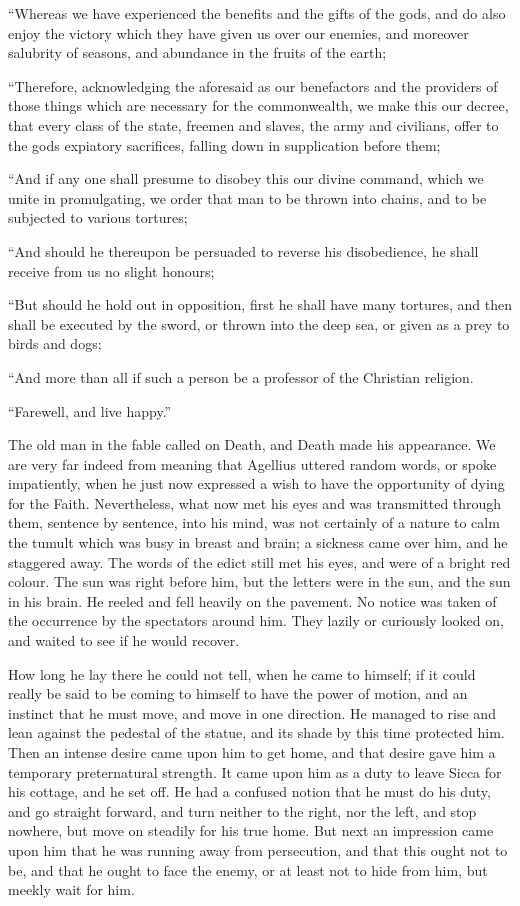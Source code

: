 ``Whereas we have experienced the benefits and the gifts of the
gods, and do also enjoy the victory which they have given us over our
enemies, and moreover salubrity of seasons, and abundance in the
fruits of the earth;

``Therefore, acknowledging the aforesaid as our benefactors and the providers of those things which are necessary for
the commonwealth, we make this our decree, that every class of the
state, freemen and slaves, the army and civilians, offer to the gods
expiatory sacrifices, falling down in supplication before them;

``And if any one shall presume to disobey this our divine
command, which we unite in promulgating, we order that man to be
thrown into chains, and to be subjected to various tortures;

``And should he thereupon be persuaded to reverse his
disobedience, he shall receive from us no slight honours;

``But should he hold out in opposition, first he shall have
many tortures, and then shall be executed by the sword, or thrown into
the deep sea, or given as a prey to birds and dogs;

``And more than all if such a person be a professor of the
Christian religion.

``Farewell, and live happy.''

The old man in the fable called on Death, and Death made his
appearance. We are very far indeed from meaning that Agellius uttered
random words, or spoke impatiently, when he just now expressed a wish
to have the opportunity of dying for the Faith. Nevertheless, what now
met his eyes and was transmitted through them, sentence by sentence,
into his mind, was not certainly of a nature to calm the tumult which
was busy in breast and brain; a sickness came over him, and he
staggered away. The words of the edict still met his eyes, and
were of a bright red colour. The sun was right before him, but the
letters were in the sun, and the sun in his brain. He reeled and fell
heavily on the pavement. No notice was taken of the occurrence by the
spectators around him. They lazily or curiously looked on, and waited
to see if he would recover.

How long he lay there he could not tell, when he came to himself;
if it could really be said to be coming to himself to have the power
of motion, and an instinct that he must move, and move in one
direction. He managed to rise and lean against the pedestal of the
statue, and its shade by this time protected him. Then an intense
desire came upon him to get home, and that desire gave him a temporary
preternatural strength. It came upon him as a duty to leave Sicca for
his cottage, and he set off. He had a confused notion that he must do
his duty, and go straight forward, and turn neither to the right, nor
the left, and stop nowhere, but move on steadily for his true home.
But next an impression came upon him that he was running away from
persecution, and that this ought not to be, and that he ought to face
the enemy, or at least not to hide from him, but meekly wait for him.

